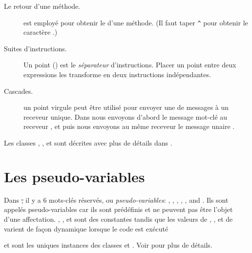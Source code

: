 \documentclass[a4paper,10pt,twoside]{book}
\begin{document}
\begin{description}
\item[Le retour d'une m\'{e}thode.] \ct{^} est employ\'{e} pour obtenir le  d'une m\'{e}thode.  (Il faut taper \verb|^| pour obtenir le caract\`{e}re \ct{^}.)

\item[Suites d'instructions.]	Un point () est le \emph{s\'{e}parateur}{ }{d'instructions}. Placer un point entre deux expressions les transforme en deux instructions ind\'{e}pendantes.	

\item[Cascades.] un point virgule peut \^{e}tre utilis\'{e} pour envoyer une  de messages \`{a} un receveur unique. Dans  nous envoyons d'abord le message mot-cl\'{e}  au receveur  , et puis nous envoyons au m\^{e}me receveur le message unaire .

\end{description}

Les classes , ,  et  sont d\'{e}crites avec plus de d\'{e}tails dans .

\section{Les pseudo-variables}

Dans \st, il y a 6 mots-cl\'{e}s r\'{e}serv\'{e}s, ou  \emph{pseudo-variables}:
, ,  ,  , , and .
Ils sont appel\'{e}s  {pseudo-variables} car ils sont pr\'{e}d\'{e}finis et ne peuvent pas \^{e}tre l'objet d'une affectation.
, , et  sont des constantes tandis que les valeurs de , , et de  varient de fa\c{c}on dynamique lorsque le code est ex\'{e}cut\'{e} 

 et  sont les uniques instances des classes   et .
Voir  pour plus de d\'{e}tails.
\end{document}
